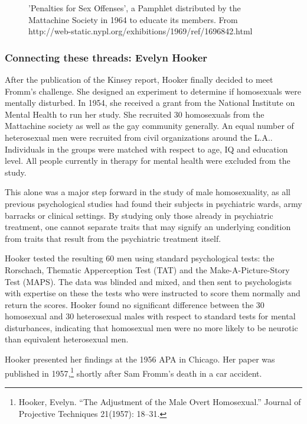 \begin{figure}[h]
 \caption{'Penalties for Sex Offenses', a Pamphlet distributed by the Mattachine Society in 1964 to educate its members. From http://web-static.nypl.org/exhibitions/1969/ref/1696842.html}
\label{fig: MattachinePamphlet}
\end{figure}


\subsubsection{Connecting these threads: Evelyn Hooker}
\label{connectingthesethreads:evelynhooker}

After the publication of the Kinsey report, Hooker finally decided to meet Fromm's challenge. She designed an experiment to determine if homosexuals were mentally disturbed. In 1954, she received a grant from the National Institute on Mental Health to run her study. She recruited 30 homosexuals from the Mattachine society as well as the gay community generally. An equal number of heterosexual men were recruited from civil organizations around the L.A.. Individuals in the groups were matched with respect to age, IQ and education level. All people currently in therapy for mental health were excluded from the study. 

This alone was a major step forward in the study of male homosexuality, as all previous psychological studies had found their subjects in psychiatric wards, army barracks or clinical settings. By studying only those already in psychiatric treatment, one cannot separate traits that may signify an underlying condition from traits that result from the psychiatric treatment itself.

Hooker tested the resulting 60 men using standard psychological tests: the Rorschach, Thematic Apperception Test (TAT) and the Make-A-Picture-Story Test (MAPS). The data was blinded and mixed, and then sent to psychologists with expertise on these the tests who were instructed to score them normally and return the scores. Hooker found no significant difference between the 30 homosexual and 30 heterosexual males with respect to standard tests for mental disturbances, indicating that homosexual men were no more likely to be neurotic than equivalent heterosexual men.

Hooker presented her findings at the 1956 APA in Chicago. Her paper was published in 1957,\footnote{Hooker, Evelyn. ``The Adjustment of the Male Overt Homosexual.'' Journal of Projective Techniques 21(1957): 18--31.} shortly after Sam Fromm's death in a car accident.

